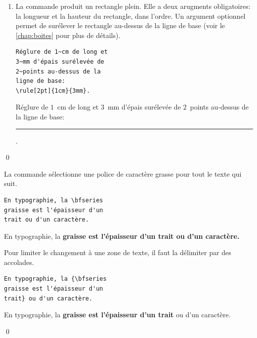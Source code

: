 \begin{exemple}
\begin{enumerate}
\begin{demo}
\begin{texample}
        connaître la syntaxe de
        {\LaTeX}.
      \end{texample}
    \end{demo}
  \item La commande \cmd{\rule} produit un rectangle plein. Elle a
    deux arugments obligatoires: la longueur et la hauteur du
    rectangle, dans l'ordre. Un argument optionnel permet de surélever
    le rectangle au-dessus de la ligne de base (voir le
    \autoref{chap:boites} pour plus de détails).
    \begin{demo}
      \begin{texample}
\begin{lstlisting}
Réglure de 1~cm de long et
3~mm d'épais surélevée de
2~points au-dessus de la
ligne de base:
\rule[2pt]{1cm}{3mm}.
\end{lstlisting}
        \producing
        Réglure de $1$~cm de long et
        $3$~mm d'épais surélevée de
        $2$~points au-dessus de la
        ligne de base: \rule[2pt]{1cm}{3mm}.
      \end{texample}
    \end{demo}
  \end{enumerate}
  \qed
\end{exemple}

\begin{exemple}
  La commande \cmd{\bfseries} sélectionne une police de caractère
  grasse pour tout le texte qui suit.
  \begin{demo}
    \begin{texample}
\begin{lstlisting}
En typographie, la \bfseries
graisse est l'épaisseur d'un
trait ou d'un caractère.
\end{lstlisting}
      \producing
      En typographie, la \bfseries
      graisse est l'épaisseur d'un
      trait ou d'un caractère.
    \end{texample}
  \end{demo}
  Pour limiter le changement à une zone de texte, il faut la délimiter
  par des accolades.
\begin{demo}
    \begin{texample}
\begin{lstlisting}
En typographie, la {\bfseries
graisse est l'épaisseur d'un
trait} ou d'un caractère.
\end{lstlisting}
      \producing
      En typographie, la {\bfseries
      graisse est l'épaisseur d’un
      trait} ou d’un caractère.
    \end{texample}
  \end{demo}
  \qed
\end{exemple}

